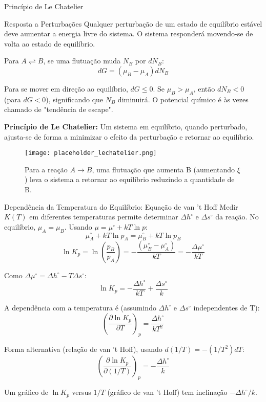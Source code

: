 \documentclass{beamer}
\begin{document}
\begin{frame}{Princípio de Le Chatelier}
    \begin{block}{Resposta a Perturbações}
        Qualquer perturbação de um estado de equilíbrio estável deve aumentar a energia livre do sistema.  O sistema responderá movendo-se de volta ao estado de equilíbrio. 
        
        Para $A \rightleftharpoons B$, se uma flutuação muda $N_B$ por $dN_B$:
        $$ dG = (\mu_B - \mu_A)dN_B $$
        
        
        Para se mover em direção ao equilíbrio, $dG \le 0$. 
        Se $\mu_B > \mu_A$, então $dN_B < 0$ (para $dG < 0$), significando que $N_B$ diminuirá. 
        O potencial químico é às vezes chamado de "tendência de escape". 
        
        \textbf{Princípio de Le Chatelier:} Um sistema em equilíbrio, quando perturbado, ajusta-se de forma a minimizar o efeito da perturbação e retornar ao equilíbrio. 
        \begin{figure}
        \centering
        \texttt{[image: placeholder\_lechatelier.png]}
        \caption{Para a reação $A \rightarrow B$, uma flutuação que aumenta B (aumentando $\xi$) leva o sistema a retornar ao equilíbrio reduzindo a quantidade de B. }
        \end{figure}
    \end{block}
\end{frame}

\begin{frame}{Dependência da Temperatura do Equilíbrio: Equação de van 't Hoff}
    Medir $K(T)$ em diferentes temperaturas permite determinar $\Delta h^{\circ}$ e $\Delta s^{\circ}$ da reação. 
    No equilíbrio, $\mu_A = \mu_B$. Usando $\mu = \mu^{\circ} + kT \ln p$:
    $$ \mu_A^{\circ} + kT \ln p_A = \mu_B^{\circ} + kT \ln p_B $$
    $$ \ln K_p = \ln\left(\frac{p_B}{p_A}\right) = -\frac{(\mu_B^{\circ} - \mu_A^{\circ})}{kT} = -\frac{\Delta\mu^{\circ}}{kT} $$
     
    Como $\Delta\mu^{\circ} = \Delta h^{\circ} - T\Delta s^{\circ}$:
    $$ \ln K_p = -\frac{\Delta h^{\circ}}{kT} + \frac{\Delta s^{\circ}}{k} $$
     
    A dependência com a temperatura é (assumindo $\Delta h^{\circ}$ e $\Delta s^{\circ}$ independentes de T):
    $$ \left(\frac{\partial \ln K_p}{\partial T}\right)_p = \frac{\Delta h^{\circ}}{kT^2} $$
     
    Forma alternativa (relação de van 't Hoff), usando $d(1/T) = -(1/T^2)dT$:
    $$ \left(\frac{\partial \ln K_p}{\partial (1/T)}\right)_p = -\frac{\Delta h^{\circ}}{k} $$
    
    Um gráfico de $\ln K_p$ versus $1/T$ (gráfico de van 't Hoff) tem inclinação $-\Delta h^{\circ}/k$. 
\end{frame}
\end{document}
